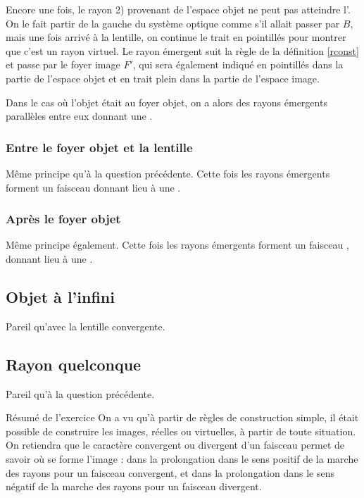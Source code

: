 \documentclass[10pt,a5paper,notitlepage]{book}
\begin{document}
Encore une fois, le rayon \textcolor{brandeisblue}{2)} provenant de l'espace
objet ne peut pas atteindre l'. On le fait partir de la gauche
du système optique comme s'il allait passer par $B$, mais une fois arrivé à la
lentille, on continue le trait en pointillés pour montrer que c'est un rayon
virtuel. Le rayon émergent suit la règle de la définition \ref{rconst} et passe
par le foyer image $F'$, qui sera également indiqué en pointillés dans la partie
de l'espace objet et en trait plein dans la partie de l'espace image. \bigbreak

Dans le cas où l'objet était au foyer objet, on a alors des rayons émergents
parallèles entre eux donnant une .

\subsubsection{Entre le foyer objet et la lentille}
Même principe qu'à la question précédente. Cette fois les rayons émergents
forment un faisceau  donnant lieu à une .

\subsubsection{Après le foyer objet}
Même principe également. Cette fois les rayons émergents forment un faisceau
, donnant lieu à une .

\subsection{Objet à l'infini}
Pareil qu'avec la lentille convergente.

\subsection{Rayon quelconque}
Pareil qu'à la question précédente.

\begin{impo}[label = resma]{Résumé de l'exercice}
    On a vu qu'à partir de règles de construction simple, il était possible de
    construire les images, réelles ou virtuelles, à partir de toute situation.
    On retiendra que le caractère convergent ou divergent d'un faisceau permet
    de savoir où se forme l'image : dans la prolongation dans le sens positif de
    la marche des rayons pour un faisceau convergent, et dans la prolongation
    dans le sens négatif de la marche des rayons pour un faisceau divergent.
\end{impo}
\end{document}
